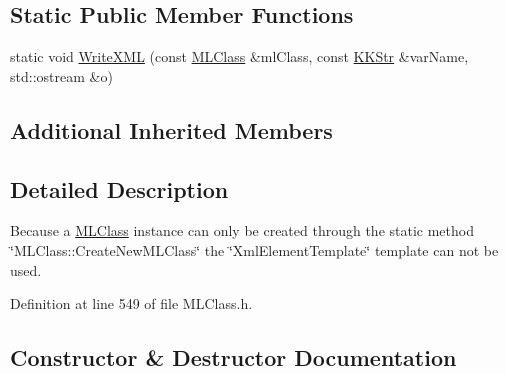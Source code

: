 \subsection*{Static Public Member Functions}
\begin{DoxyCompactItemize}
\item 
static void \hyperlink{class_k_k_m_l_l_1_1_xml_element_m_l_class_a6fbb075e2c338361640bce1ede48eef5}{Write\+X\+ML} (const \hyperlink{class_k_k_m_l_l_1_1_m_l_class}{M\+L\+Class} \&ml\+Class, const \hyperlink{class_k_k_b_1_1_k_k_str}{K\+K\+Str} \&var\+Name, std\+::ostream \&o)
\end{DoxyCompactItemize}
\subsection*{Additional Inherited Members}


\subsection{Detailed Description}

\begin{DoxyItemize}
\item Because a \hyperlink{class_k_k_m_l_l_1_1_m_l_class}{M\+L\+Class} instance can only be created through the static method \char`\"{}\+M\+L\+Class\+::\+Create\+New\+M\+L\+Class\char`\"{} the \char`\"{}\+Xml\+Element\+Template\char`\"{} template can not be used. 
\end{DoxyItemize}

Definition at line 549 of file M\+L\+Class.\+h.



\subsection{Constructor \& Destructor Documentation}
